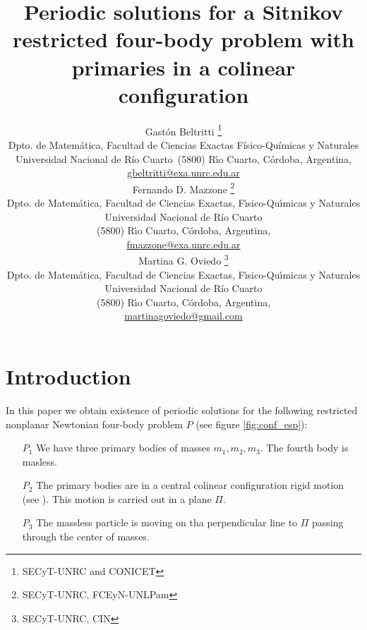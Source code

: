 \documentclass[twoside]{article}
\title{Periodic solutions for a Sitnikov restricted four-body problem with primaries in a colinear configuration}
\author{Gast\'on Beltritti \thanks{SECyT-UNRC and CONICET}\\
Dpto. de Matem\'atica, Facultad de Ciencias Exactas Físico-Químicas y Naturales\\
Universidad Nacional de R\'{i}o Cuarto\
(5800) R\'{\i}o Cuarto, C\'ordoba, Argentina,\\
\url{gbeltritti@exa.unrc.edu.ar}\\[3mm]
Fernando D. Mazzone \thanks{SECyT-UNRC, FCEyN-UNLPam}\\
Dpto. de Matem\'atica, Facultad de Ciencias Exactas, F\'{\i}sico-Qu\'{\i}micas y Naturales\\
Universidad Nacional de R\'{i}o Cuarto\\
(5800) R\'{\i}o Cuarto, C\'ordoba, Argentina,\\
\url{fmazzone@exa.unrc.edu.ar}\\
Martina G. Oviedo \thanks{SECyT-UNRC, CIN}\\
Dpto. de Matem\'atica, Facultad de Ciencias Exactas, F\'{\i}sico-Qu\'{\i}micas y Naturales\\
Universidad Nacional de R\'{i}o Cuarto\\
(5800) R\'{\i}o Cuarto, C\'ordoba, Argentina,\\
\url{martinagoviedo@gmail.com}
}
\date{}
\theoremstyle{remark}
\begin{document}
\maketitle
%
%
%
%
%

\begin{abstract}


\end{abstract}




\pagestyle{fancy} \headheight 35pt \fancyhead{} \fancyfoot{}

\fancyfoot[C]{\thepage}  \fancyhead[CO]{\nouppercase{\section}}

\fancyhead[CO]{\nouppercase{\leftmark}}






\section{Introduction}
In this paper we obtain existence of periodic solutions for the following restricted nonplanar Newtonian four-body problem $P$ (see figure \ref{fig:conf_esp}):
\begin{itemize}
 \item[$P_1$] We have three primary bodies of masses $m_1,m_2,m_3$. The fourth body is masless.
 \item[$P_2$] The primary bodies are in a central colinear configuration rigid motion (see \cite[Section 2.9]{JaumeLlibre276}). This motion is carried out in a plane $\Pi$.
 \item[$P_3$] The massless particle is moving on tha perpendicular line to $\Pi$ passing through the center of masses.
\end{itemize}
\end{document}
